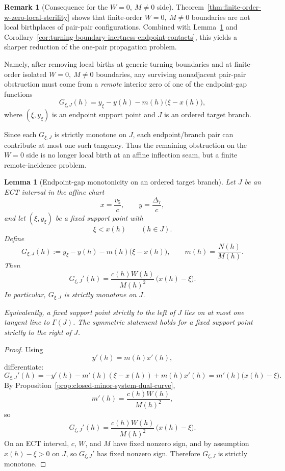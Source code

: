 \documentclass[11pt,a4paper]{amsart}
\theoremstyle{plain}
\newtheorem{lemma}[theorem]{Lemma}
\theoremstyle{definition}
\newtheorem{remark}[theorem]{Remark}
\begin{document}
\begin{remark}[Consequence for the $W=0,\ M\neq 0$ side]
\label{rem:consequence-finite-order-w-zero-local-sterility}
Theorem~\ref{thm:finite-order-w-zero-local-sterility} shows that finite-order
$W=0,\ M\neq 0$ boundaries are not local birthplaces of pair-pair
configurations. Combined with
Lemma~\ref{lem:endpoint-gap-monotonicity-ordered-target} and
Corollary~\ref{cor:turning-boundary-inertness-endpoint-contacts}, this yields a
sharper reduction of the one-pair propagation problem.

Namely, after removing local births at generic turning boundaries and at
finite-order isolated $W=0,\ M\neq 0$ boundaries, any surviving nonadjacent
pair-pair obstruction must come from a \emph{remote} interior zero of one of
the endpoint-gap functions
\[
G_{\xi,J}(h)=y_\xi-y(h)-m(h)\bigl(\xi-x(h)\bigr),
\]
where $(\xi,y_\xi)$ is an endpoint support point and $J$ is an ordered target
branch.

Since each $G_{\xi,J}$ is strictly monotone on $J$, each endpoint/branch pair
can contribute at most one such tangency. Thus the remaining obstruction on the
$W=0$ side is no longer local birth at an affine inflection seam, but a finite
remote-incidence problem.
\end{remark}

\begin{lemma}[Endpoint-gap monotonicity on an ordered target branch]
\label{lem:endpoint-gap-monotonicity-ordered-target}
Let $J$ be an ECT interval in the affine chart
\[
x=\frac{v_5}{c},
\qquad
y=\frac{\Delta_7}{c},
\]
and let $(\xi,y_\xi)$ be a fixed support point with
\[
\xi< x(h)\qquad (h\in J).
\]
Define
\[
G_{\xi,J}(h):=y_\xi-y(h)-m(h)\bigl(\xi-x(h)\bigr),
\qquad
m(h)=\frac{N(h)}{M(h)}.
\]
Then
\[
G_{\xi,J}'(h)
=
\frac{c(h)W(h)}{M(h)^2}\,\bigl(x(h)-\xi\bigr).
\]
In particular, $G_{\xi,J}$ is strictly monotone on $J$.

Equivalently, a fixed support point strictly to the left of $J$ lies on at most
one tangent line to $\Gamma(J)$. The symmetric statement holds for a fixed
support point strictly to the right of $J$.
\end{lemma}

\begin{proof}
Using
\[
y'(h)=m(h)x'(h),
\]
differentiate:
\[
G_{\xi,J}'(h)
=
-y'(h)-m'(h)(\xi-x(h))+m(h)x'(h)
=
m'(h)\bigl(x(h)-\xi\bigr).
\]
By Proposition~\ref{prop:closed-minor-system-dual-curve},
\[
m'(h)=\frac{c(h)W(h)}{M(h)^2},
\]
so
\[
G_{\xi,J}'(h)
=
\frac{c(h)W(h)}{M(h)^2}\,\bigl(x(h)-\xi\bigr).
\]
On an ECT interval, $c$, $W$, and $M$ have fixed nonzero sign, and by
assumption $x(h)-\xi>0$ on $J$, so $G_{\xi,J}'$ has fixed nonzero sign.
Therefore $G_{\xi,J}$ is strictly monotone.
\end{proof}
\end{document}
